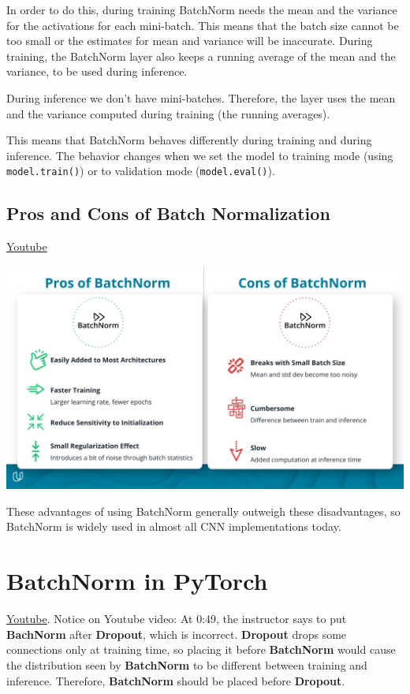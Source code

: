 In order to do this, during training BatchNorm needs the mean and the variance for the activations for each mini-batch. This means that the batch size cannot be too small or the estimates for mean and variance will be inaccurate. During training, the BatchNorm layer also keeps a running average of the mean and the variance, to be used during inference. \newline

During inference we don't have mini-batches. Therefore, the layer uses the mean and the variance computed during training (the running averages). \newline

This means that BatchNorm behaves differently during training and during inference. The behavior changes when we set the model to training mode (using \lstinline{model.train()}) or to validation mode (\lstinline{model.eval()}).

\subsection{Pros and Cons of Batch Normalization}
\href{https://www.youtube.com/watch?v=75KLWEruuLs&t=1s&ab_channel=Udacity}{Youtube} \newline

\includegraphics[width=1\linewidth]{img//cnn//depth/dlnd-refresh-c2-cd1821-cnns-l3.jpeg}

These advantages of using BatchNorm generally outweigh these disadvantages, so BatchNorm is widely used in almost all CNN implementations today.


\section{BatchNorm in PyTorch}
\href{https://www.youtube.com/watch?v=cvYC40wyo2U&t=1s&ab_channel=Udacity}{Youtube}. Notice on Youtube video: At 0:49, the instructor says to put \textbf{BachNorm} after \textbf{Dropout}, which is incorrect. \textbf{Dropout} drops some connections only at training time, so placing it before \textbf{BatchNorm} would cause the distribution seen by \textbf{BatchNorm} to be different between training and inference. Therefore, \textbf{BatchNorm} should be placed before \textbf{Dropout}.

